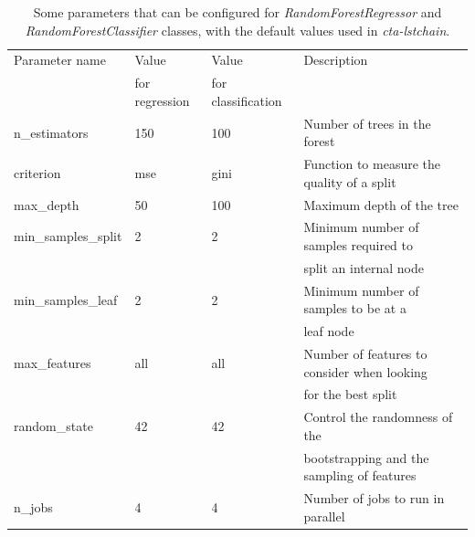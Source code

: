 \documentclass[main.tex]{subfiles}
\begin{document}
\begin{table}
  \centering
  \begin{tabular}{|l|l|l|l|}
    \hline
    Parameter name & Value          & Value              & Description\\
                   & for regression & for classification &  \\ 
    \hline
    n\_estimators       & 150 & 100  & \small{Number of trees in the forest}\\
    criterion           & mse & gini & \small{Function to measure the quality of a split}\\
    max\_depth          & 50  & 100  & \small{Maximum depth of the tree}\\
    min\_samples\_split & 2   & 2    & \small{Minimum number of samples required to}\\
                        &     &      & \small{split an internal node} \\ 
    min\_samples\_leaf  & 2   & 2    & \small{Minimum number of samples to be at a}\\
                        &     &      & \small{leaf node} \\     
    max\_features       & all & all  & \small{Number of features to consider when looking} \\
                        &     &      & \small{for the best split}\\
    random\_state       & 42  & 42   & \small{Control the randomness of the} \\
                        &     &      & \small{bootstrapping and the sampling of features}\\
    n\_jobs             & 4   & 4    & \small{Number of jobs to run in parallel}\\
    \hline
  \end{tabular}
  \caption{Some parameters that can be configured for \textit{RandomForestRegressor} and \textit{RandomForestClassifier} classes, with the default values used in \textit{cta-lstchain}.}
  \label{tab:RFpars}
  \end{table}
\end{document}
